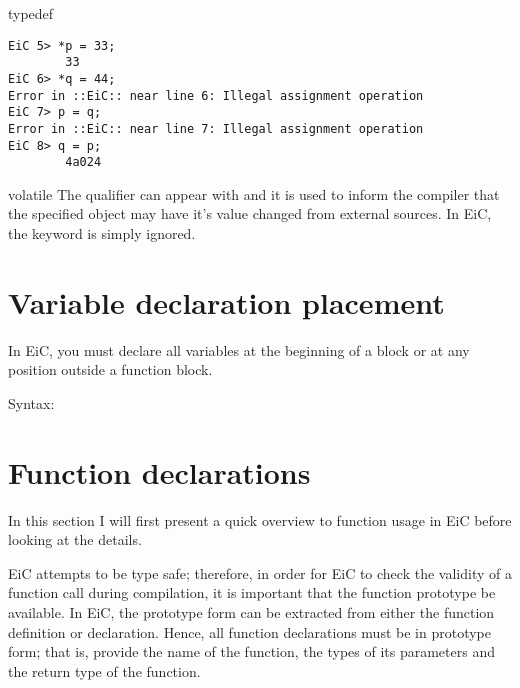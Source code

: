 \begin{Ventry}{typedef}
\begin{production}
\begin{verbatim}
EiC 5> *p = 33;
        33
EiC 6> *q = 44;
Error in ::EiC:: near line 6: Illegal assignment operation
EiC 7> p = q;
Error in ::EiC:: near line 7: Illegal assignment operation
EiC 8> q = p;
        4a024
\end{verbatim}
\end{production}

\item[volatile]
\label{item:volatile}
 The  qualifier can appear with
 and it  is used to inform the compiler that the specified object may have it's  value changed from external sources. 
In EiC, the  keyword is simply ignored.

\end{Ventry}
\normalsize


\section{Variable declaration placement}
\label{sec:VariablePlacement}

In EiC, you must declare all variables at the beginning of a block or
at any position outside a function block.

Syntax:

\begin{quote}
\end{quote}

\section{Function declarations}
\label{sec:FunctionDeclarations}

In this section I will first present a quick overview  to function
usage in EiC before looking at the details.

EiC attempts to be type safe; therefore,
in order for EiC to check the validity of a function call during
compilation, it is important that the function prototype be available.
In EiC, the prototype form can be extracted from either the function
definition or declaration. Hence, all function declarations must be in
prototype form; that is, provide the
name of the function, the types of its parameters and the return type
of the function.

